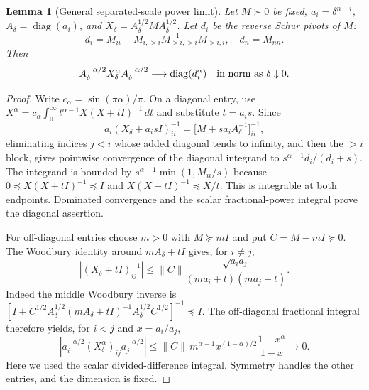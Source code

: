 \documentclass[11pt]{article}
\newtheorem{lemma}[theorem]{Lemma}
\newcommand{\diag}{\operatorname{diag}}
\newcommand{\norm}[1]{\lVert#1\rVert}
\begin{document}
\begin{lemma}[General separated-scale power limit]\label{lem:scale}
Let $M\succ0$ be fixed, $a_i=\delta^{n-i}$,
$A_\delta=\diag(a_i)$, and
$X_\delta=A_\delta^{1/2}MA_\delta^{1/2}$.
Let $d_i$ be the reverse Schur pivots of $M$:
\[
 d_i=M_{ii}-M_{i,>i}M_{>i,>i}^{-1}M_{>i,i},\quad d_n=M_{nn}.
\]
Then
\[
 A_\delta^{-\alpha/2}X_\delta^\alpha A_\delta^{-\alpha/2}
       \longrightarrow\diag(d_i^\alpha)
 \quad\hbox{in norm as }\delta\downarrow0.
\]
\end{lemma}
\begin{proof}
Write $c_\alpha=\sin(\pi\alpha)/\pi$. On a diagonal entry, use
$X^\alpha=c_\alpha\int_0^\infty t^{\alpha-1}X(X+tI)^{-1}\,dt$
and substitute $t=a_i s$. Since
\[
 a_i(X_\delta+a_i sI)^{-1}_{ii}
  =\bigl[M+s a_iA_\delta^{-1}\bigr]^{-1}_{ii},
\]
eliminating indices $j<i$ whose added diagonal tends to infinity, and then
the $>i$ block, gives pointwise convergence of the diagonal integrand to
$s^{\alpha-1}d_i/(d_i+s)$. The integrand is bounded by
$s^{\alpha-1}\min(1,M_{ii}/s)$ because
$0\preceq X(X+tI)^{-1}\preceq I$ and $X(X+tI)^{-1}\preceq X/t$.
This is integrable at both endpoints. Dominated convergence and the scalar
fractional-power integral prove the diagonal assertion.

For off-diagonal entries choose $m>0$ with $M\succeq mI$ and put
$C=M-mI\succeq0$. The Woodbury identity around $mA_\delta+tI$ gives,
for $i\ne j$,
\[
 \left|(X_\delta+tI)^{-1}_{ij}\right|
 \le \norm C\frac{\sqrt{a_i a_j}}{(ma_i+t)(ma_j+t)}.
\]
Indeed the middle Woodbury inverse is
$[I+C^{1/2}A_\delta^{1/2}(mA_\delta+tI)^{-1}
A_\delta^{1/2}C^{1/2}]^{-1}\preceq I$.
The off-diagonal fractional integral therefore yields, for $i<j$ and
$x=a_i/a_j$,
\[
 \left|a_i^{-\alpha/2}(X_\delta^\alpha)_{ij}a_j^{-\alpha/2}\right|
 \le \norm C\,m^{\alpha-1}
 x^{(1-\alpha)/2}\frac{1-x^\alpha}{1-x}\longrightarrow0.
\]
Here we used the scalar divided-difference integral. Symmetry handles the
other entries, and the dimension is fixed.
\end{proof}
\end{document}
